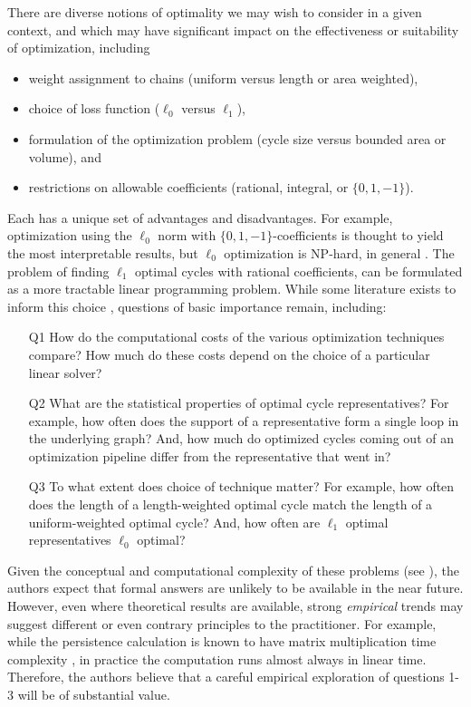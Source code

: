 \documentclass[11pt,onecolumn]{article}
\theoremstyle{plain}
\theoremstyle{definition}
\begin{document}
There are diverse notions of optimality we may wish to consider in a given context, and which may have significant impact on the effectiveness or suitability of  optimization, including  
\begin{itemize}
    \item weight assignment to chains (uniform versus length or area weighted), 
 \item choice of loss function ($\ell_0$ versus $\ell_1$), 
 \item formulation of the optimization problem (cycle size versus bounded area or volume), and \item restrictions on allowable coefficients (rational, integral, or $\{0,1,-1\}$).  
 \end{itemize}
 Each has a unique set of advantages and disadvantages. For example, optimization using the $\ell_0$ norm with $\{0, 1, -1\}$-coefficients is thought to yield the most interpretable results, but $\ell_0$ optimization is NP-hard, in general \cite{chenhardness}. 
The problem of finding $\ell_1$ optimal cycles with rational coefficients, can be formulated as a more tractable linear programming problem.
While some literature exists to inform this choice \cite{dey2011optimal,Escolar2016,Obayashi2018}, questions of basic importance remain, including: 

\begin{enumerate}
  \item[Q1] How do the computational costs of the various optimization techniques compare? How much do these costs depend on the choice of a particular linear solver? 
  \item[Q2] What are the statistical properties of optimal cycle representatives? For example,  how often does the support of a representative form a single loop in the underlying graph? And,  how much do optimized cycles coming out of an optimization pipeline differ from the representative that went in?     
    \item[Q3] To what extent does choice of technique matter? For example, how often does the length of a length-weighted optimal cycle match the length of a uniform-weighted optimal cycle? 
    And, how often are $\ell_1$ optimal representatives $\ell_0$ optimal? 
\end{enumerate}

Given the conceptual and computational complexity of these problems (see \cite{chenhardness}), the authors expect that formal answers are unlikely to be available in the near future. However, even where theoretical results are available, strong \emph{empirical} trends may suggest different or even contrary principles to the practitioner. For example, while the persistence calculation is known to have matrix multiplication time complexity  \cite{primoz}, in practice the computation runs almost always in linear time. Therefore, the authors believe that a careful empirical exploration of questions 1-3 will be of substantial value. 
\end{document}
